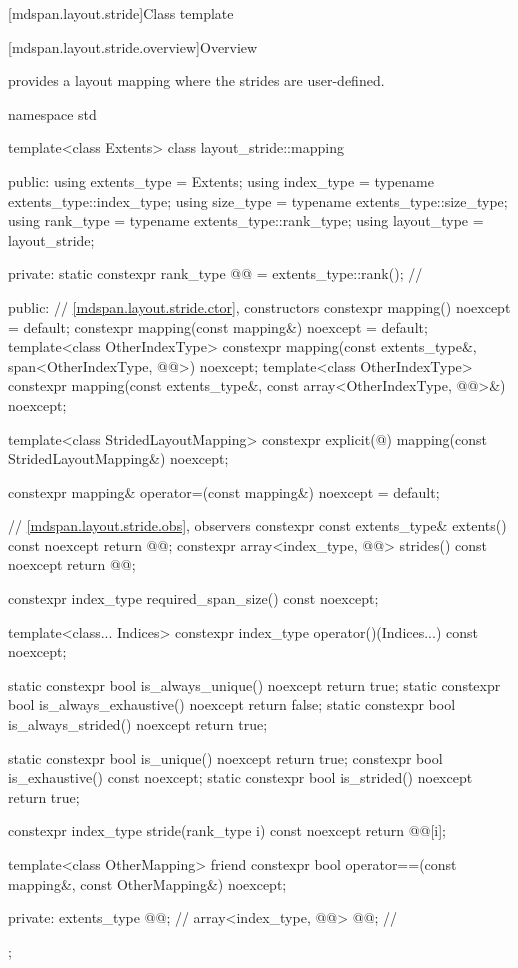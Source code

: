 [mdspan.layout.stride]{Class template }

[mdspan.layout.stride.overview]{Overview}

\pnum
{} provides a layout mapping
where the strides are user-defined.

\begin{codeblock}
namespace std {
  template<class Extents>
  class layout_stride::mapping {
  public:
    using extents_type = Extents;
    using index_type = typename extents_type::index_type;
    using size_type = typename extents_type::size_type;
    using rank_type = typename extents_type::rank_type;
    using layout_type = layout_stride;

  private:
    static constexpr rank_type @@ = extents_type::rank();    // \expos

  public:
    // \ref{mdspan.layout.stride.ctor}, constructors
    constexpr mapping() noexcept = default;
    constexpr mapping(const mapping&) noexcept = default;
    template<class OtherIndexType>
      constexpr mapping(const extents_type&, span<OtherIndexType, @@>) noexcept;
    template<class OtherIndexType>
      constexpr mapping(const extents_type&, const array<OtherIndexType, @@>&) noexcept;

    template<class StridedLayoutMapping>
      constexpr explicit(@\seebelow@) mapping(const StridedLayoutMapping&) noexcept;

    constexpr mapping& operator=(const mapping&) noexcept = default;

    // \ref{mdspan.layout.stride.obs}, observers
    constexpr const extents_type& extents() const noexcept { return @@; }
    constexpr array<index_type, @@> strides() const noexcept { return @@; }

    constexpr index_type required_span_size() const noexcept;

    template<class... Indices>
      constexpr index_type operator()(Indices...) const noexcept;

    static constexpr bool is_always_unique() noexcept { return true; }
    static constexpr bool is_always_exhaustive() noexcept { return false; }
    static constexpr bool is_always_strided() noexcept { return true; }

    static constexpr bool is_unique() noexcept { return true; }
    constexpr bool is_exhaustive() const noexcept;
    static constexpr bool is_strided() noexcept { return true; }

    constexpr index_type stride(rank_type i) const noexcept { return @@[i]; }

    template<class OtherMapping>
      friend constexpr bool operator==(const mapping&, const OtherMapping&) noexcept;

  private:
    extents_type @@{};                    // \expos
    array<index_type, @@> @@{};        // \expos
  };
}
\end{codeblock}

